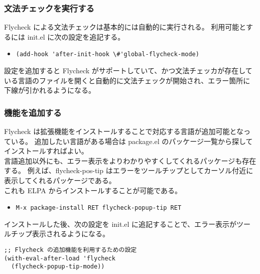 \subsubsection{文法チェックを実行する}
Flycheck による文法チェックは基本的には自動的に実行される。
利用可能とするには init.el に次の設定を追記する。
\begin{itemize}\setlength{\leftskip}{-1.00zw}%
\item[] \verb|(add-hook 'after-init-hook \#'global-flycheck-mode)|
\end{itemize}
設定を追加すると Flycheck がサポートしていて、かつ文法チェッカが存在している言語のファイルを開くと自動的に文法チェックが開始され、エラー箇所に下線が引かれるようになる。
\subsubsection{機能を追加する}
Flycheck は拡張機能をインストールすることで対応する言語が追加可能となっている。
追加したい言語がある場合は package.el のパッケージ一覧から探してインストールすればよい。\\

言語追加以外にも、エラー表示をよりわかりやすくしてくれるパッケージも存在する。
例えば、flycheck-pos-tip はエラーをツールチップとしてカーソル付近に表示してくれるパッケージである。\\

これも ELPA からインストールすることが可能である。
\begin{itemize}\setlength{\leftskip}{-1.00zw}%
\item[] \texttt{M-x package-install RET flycheck-popup-tip RET}
\end{itemize}
インストールした後、次の設定を init.el に追記することで、エラー表示がツールチップ表示されるようになる。
\begin{mdframed}[roundcorner=0.50zw,leftmargin=3.00zw,rightmargin=3.00zw,skipabove=0.40zw,skipbelow=0.40zw,innertopmargin=4.00pt,innerbottommargin=4.00pt,innerleftmargin=5.00pt,innerrightmargin=5.00pt,linecolor=gray!020,linewidth=0.50pt,backgroundcolor=gray!20]
\begin{verbatim}
;; Flycheck の追加機能を利用するための設定
(with-eval-after-load 'flycheck
  (flycheck-popup-tip-mode))
\end{verbatim}
\end{mdframed}
